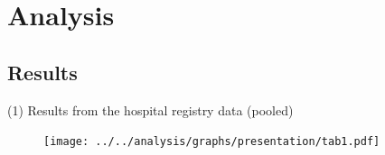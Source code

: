 \documentclass[aspectratio=169,handout]{beamer} %
\begin{document}
\section{Analysis}



\subsection{Results}
\begin{frame}{(1) Results from the hospital registry data (pooled)}

\begin{figure}\centering
\texttt{[image: ../../analysis/graphs/presentation/tab1.pdf]}
\end{figure}


\end{frame}
\end{document}
